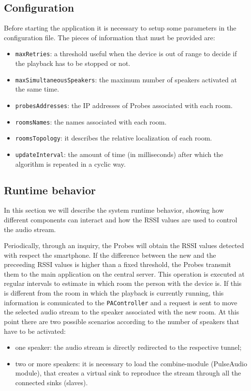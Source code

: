 \documentclass[conference]{IEEEtran}
\begin{document}
\subsection{Configuration}
Before starting the application it is necessary to setup some parameters in the configuration file. The pieces of information that must be provided are:
\begin{itemize}
\item \texttt{maxRetries}: a threshold useful when the device is out of range to decide if the playback has to be stopped or not.
\item \texttt{maxSimultaneousSpeakers}: the maximum number of speakers activated at the same time.
\item \texttt{probesAddresses}: the IP addresses of Probes associated with each room.
\item \texttt{roomsNames}: the names associated with each room.
\item \texttt{roomsTopology}: it describes the relative localization of each room. %
\item \texttt{updateInterval}: the amount of time (in milliseconds) after which the algorithm is repeated in a cyclic way.
\end{itemize}

\subsection{Runtime behavior}
In this section we will describe the system runtime behavior, showing how different components can interact and how the RSSI values are used to control the audio stream.

Periodically, through an inquiry, the Probes will obtain the RSSI values detected with respect the smartphone. If the difference between the new and the preceeding RSSI values is higher than a fixed threshold, the Probes transmit them to the main application on the central server. This operation is executed at regular intervals to estimate in which room the person with the device is. If this is different from the room in which the playback is currently running, this information is comunicated to the \texttt{PAController} and a request is sent to move the selected audio stream to the speaker associated with the new room. At this point there are two possible scenarios according to the number of speakers that have to be activated:
\begin{itemize}
	\item one speaker: the audio stream is directly redirected to the respective tunnel;
	\item two or more speakers: it is necessary to load the combine-module (PulseAudio module), that creates a virtual sink to reproduce the stream through all the connected sinks (slaves).
\end{itemize}
\end{document}
